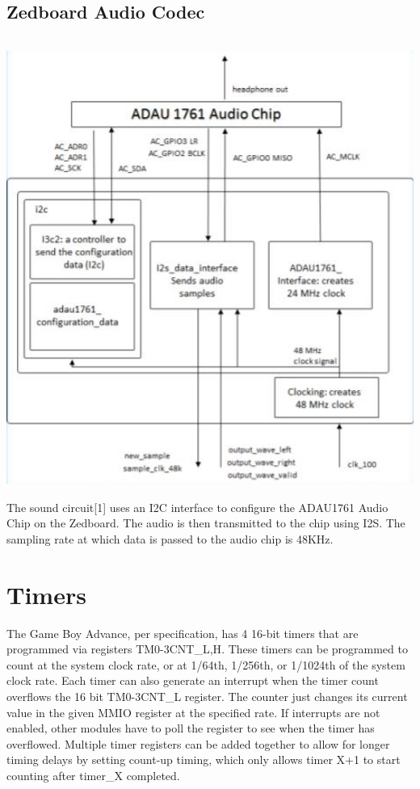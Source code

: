 \documentclass[11pt,a4paper]{article}
\begin{document}
	\subsection{Zedboard Audio Codec}
	\includegraphics[width=14cm, height=15cm, keepaspectratio=true]{newcodec}
	The sound circuit[1] uses an I2C interface to configure the ADAU1761 Audio Chip on the Zedboard.  The audio is then transmitted to the chip using I2S.  The sampling rate at which data is passed to the audio chip is 48KHz.
	
	\section{Timers}
	The Game Boy Advance, per specification, has 4 16-bit timers that are programmed via registers TM{0-3}CNT\_{L,H}. These timers can be programmed to count at the system clock rate, or at 1/64th, 1/256th, or 1/1024th of the system clock rate. Each timer can also generate an interrupt when the timer count overflows the 16 bit TM{0-3}CNT\_L register. The counter just changes its current value in the given MMIO register at the specified rate.  If interrupts are not enabled, other modules have to poll the register to see when the timer has overflowed.  Multiple timer registers can be added together to allow for longer timing delays by setting count-up timing, which only allows timer X+1 to start counting after timer\_X completed.\\
	
\end{document}
